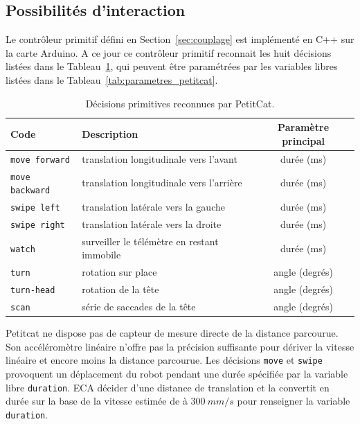 \subsection{Possibilités d'interaction}
\label{sec:interactions}

\noindent
Le contrôleur primitif défini en Section~\ref{sec:couplage} est implémenté en C++ sur la carte Arduino. 
A ce jour ce contrôleur primitif  reconnait les huit décisions listées dans le Tableau~\ref{tab:decision_petitcat}, qui peuvent être paramétrées par les variables libres listées dans le  Tableau~\ref{tab:parametres_petitcat}.



\begin{table}[h]
	\centering
	\begin{tabular}{|l|l|c|}
		\hline
		\textbf{Code} & \textbf{Description} & \textbf{Paramètre principal}  \\ \hline
		\texttt{move forward} & translation longitudinale vers l'avant & durée (ms) \\ \hline
		\texttt{move backward} & translation longitudinale vers l'arrière& durée (ms) \\ \hline
		\texttt{swipe left} & translation latérale vers la gauche & durée (ms) \\ \hline
		\texttt{swipe right} & translation latérale vers la droite & durée (ms) \\ \hline
		\texttt{watch} & surveiller le télémètre en restant immobile & durée (ms) \\ \hline
		\texttt{turn} & rotation sur place & angle (degrés) \\ \hline
		\texttt{turn-head} & rotation de la tête & angle (degrés)\\ \hline
		\texttt{scan} & série de saccades de la tête & angle (degrés) \\ \hline
	\end{tabular}
	\caption{Décisions primitives reconnues par PetitCat.
	}
	\label{tab:decision_petitcat}
\end{table}

Petitcat ne dispose pas de capteur de mesure directe de la distance parcourue. 
Son accéléromètre linéaire n'offre pas la précision suffisante pour dériver la vitesse linéaire et encore moins la distance parcourue. 
Les décisions \texttt{move} et \texttt{swipe} provoquent un déplacement du robot pendant une durée spécifiée par  la variable libre \texttt{duration}. 
ECA décider d'une distance de translation et la convertit en durée sur la base de la vitesse estimée de à $300~mm/s$ pour renseigner la variable \texttt{duration}.

